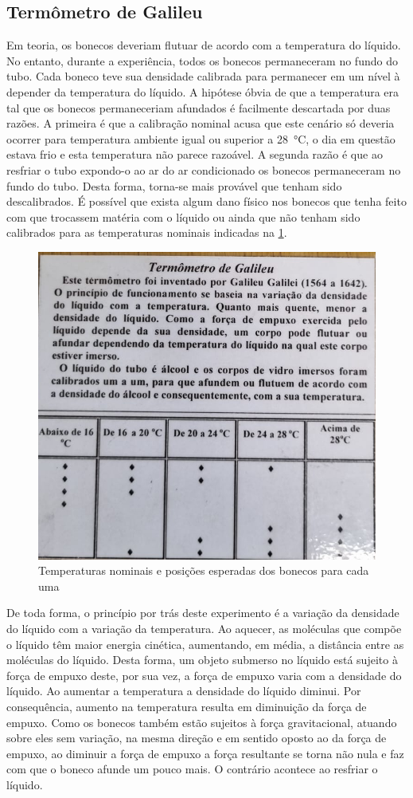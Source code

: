 \subsection{Termômetro de Galileu}

Em teoria, os bonecos deveriam flutuar de acordo com a temperatura do líquido. No entanto, durante a experiência, todos os bonecos permaneceram no fundo do tubo. Cada boneco teve sua densidade calibrada para permanecer em um nível à depender da temperatura do líquido. A hipótese óbvia de que a temperatura era tal que os bonecos permaneceriam afundados é facilmente descartada por duas razões. A primeira é que a calibração nominal acusa que este cenário só deveria ocorrer para temperatura ambiente igual ou superior a \qty{28}{\celsius}, o dia em questão estava frio e esta temperatura não parece razoável. A segunda razão é que ao resfriar o tubo expondo-o ao ar do ar condicionado os bonecos permaneceram no fundo do tubo. Desta forma, torna-se mais provável que tenham sido descalibrados. É possível que exista algum dano físico nos bonecos que tenha feito com que trocassem matéria com o líquido ou ainda que não tenham sido calibrados para as temperaturas nominais indicadas na \cref{temps}.

\begin{figure}[h]
    \centering
    \includegraphics[width=.5\linewidth]{fig/temps}
    \caption{Temperaturas nominais e posições esperadas dos bonecos para cada uma}\label{temps}
\end{figure}

De toda forma, o princípio por trás deste experimento é a variação da densidade do líquido com a variação da temperatura. Ao aquecer, as moléculas que compõe o líquido têm maior energia cinética, aumentando, em média, a distância entre as moléculas do líquido. Desta forma, um objeto submerso no líquido está sujeito à força de empuxo deste, por sua vez, a força de empuxo varia com a densidade do líquido. Ao aumentar a temperatura a densidade do líquido diminui. Por consequência, aumento na temperatura resulta em diminuição da força de empuxo. Como os bonecos também estão sujeitos à força gravitacional, atuando sobre eles sem variação, na mesma direção e em sentido oposto ao da força de empuxo, ao diminuir a força de empuxo a força resultante se torna não nula e faz com que o boneco afunde um pouco mais. O contrário acontece ao resfriar o líquido. 

